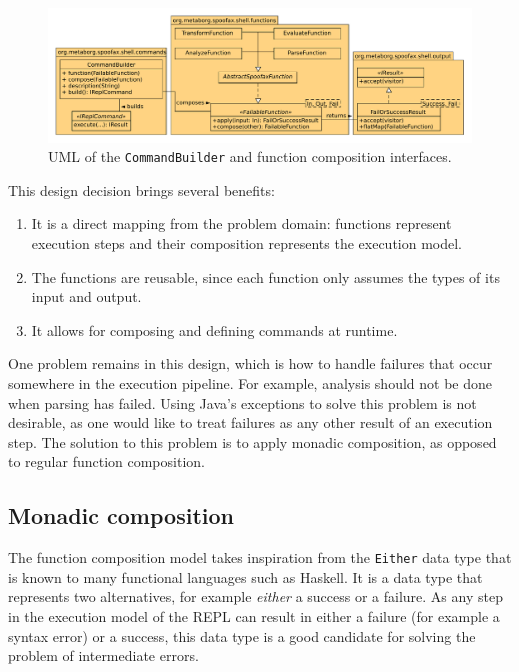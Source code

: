 \begin{figure}[b]
  \centering
  \includegraphics[width=\textwidth]{uml-function-comp}
  \caption{UML of the \texttt{CommandBuilder} and function composition
    interfaces.}
  \label{fig:uml-function-comp}
\end{figure}

This design decision brings several benefits:

\begin{enumerate}
\item It is a direct mapping from the problem domain: functions
  represent execution steps and their composition represents the
  execution model.
\item The functions are reusable, since each function only assumes
  the types of its input and output.
\item It allows for composing and defining commands at runtime.
\end{enumerate}

One problem remains in this design, which is how to handle failures that occur
somewhere in the execution pipeline. For example, analysis should not be
done when parsing has failed. Using Java's exceptions to solve this problem
is not desirable, as one would like to treat failures as any other result of an
execution step. The solution to this problem is to apply monadic composition, as
opposed to regular function composition.

\subsection{Monadic composition}
\label{sec:monadic-composition}
The function composition model takes inspiration from the \texttt{Either}
data type that is known to many functional languages such as
Haskell. It is a data type that represents two alternatives, for
example \textit{either} a success or a failure. As any step in the
execution model of the REPL can result in either a failure (for
example a syntax error) or a success, this data type is a good
candidate for solving the problem of intermediate errors.


